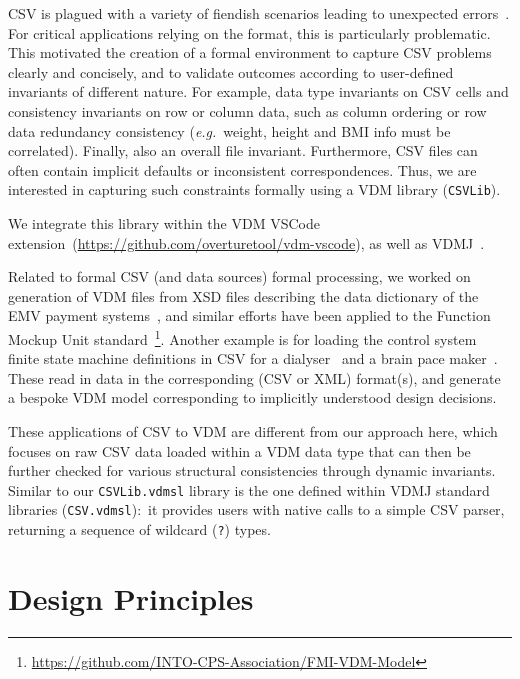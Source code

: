 \documentclass[runningheads,a4paper]{llncs}
\begin{document}
CSV is plagued with a variety of fiendish scenarios leading to unexpected errors~\cite{csv-validation-pharma-msc,10.1145/3274856.3274879,alastairMSc}. For critical applications relying on the format, this is particularly problematic. This motivated the creation of a formal environment to capture CSV problems clearly and concisely, and to validate outcomes according to user-defined invariants of different nature. For example, data type invariants on CSV cells and consistency invariants on row or column data, such as column ordering or row data redundancy consistency (\textit{e.g.}~weight, height and BMI info must be correlated). Finally, also an overall file invariant. Furthermore, CSV files can often contain implicit defaults or inconsistent correspondences. Thus, we are interested in capturing such constraints formally using a VDM library (\texttt{CSVLib}).      

We integrate this library within the VDM VSCode extension~(\url{https://github.com/overturetool/vdm-vscode}), as well as VDMJ~\cite{Battle09}. 

Related to formal CSV (and data sources) formal processing, we worked on generation of VDM files from XSD files describing the data dictionary of the EMV payment systems~\cite{emv2}, and similar efforts have been applied to the Function Mockup Unit standard~\footnote{\url{https://github.com/INTO-CPS-Association/FMI-VDM-Model}}. Another example is for loading the control system finite state machine definitions in CSV for a dialyser~\cite{egleUG} and a brain pace maker~\cite{alastairMSc}. These read in data in the corresponding (CSV or XML) format(s), and generate a bespoke VDM model corresponding to implicitly understood design decisions. 

These applications of CSV to VDM are different from our approach here, which focuses on raw CSV data loaded within a VDM data type that can then be further checked for various structural consistencies through dynamic invariants. Similar to our \texttt{CSVLib.vdmsl} library is the one defined within VDMJ standard libraries (\texttt{CSV.vdmsl}):~it provides users with native calls to a simple CSV parser, returning a sequence of wildcard (\texttt{?}) types. 


\section{Design Principles}\label{sec:principles}
\end{document}
